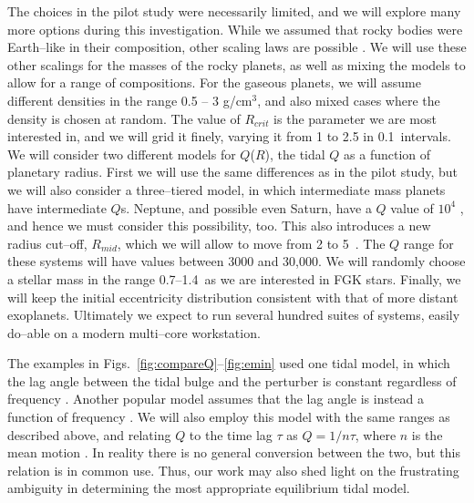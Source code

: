 The choices in the pilot study were necessarily limited, and we will
explore many more options during this investigation.  While we assumed that
rocky bodies were Earth--like in their composition, other scaling laws
are possible \citep[e.g.][]{Seager07,Fortney07,Lissauer11}.  We will
use these other scalings for the masses of the rocky planets, as well
as mixing the models to allow for a range of compositions.  For the
gaseous planets, we will assume different densities in the range 0.5
-- 3 g/cm$^3$, and also mixed cases where the density is chosen at
random.  The value of $R_{crit}$ is the parameter we are most
interested in, and we will grid it finely, varying it from 1 to 2.5
\rearth in 0.1~\rearth intervals.  We will consider two different
models for $Q$($R$), the tidal $Q$ as a function of planetary radius.
First we will use the same differences as in the pilot study, but we
will also consider a three--tiered model, in which intermediate mass
planets have intermediate $Q$s.  Neptune, and possible even Saturn,
have a $Q$ value of $10^4$ \citep{ZhangHamilton08,Lainey12}, and hence
we must consider this possibility, too.  This also introduces a new
radius cut--off, $R_{mid}$, which we will allow to move from 2 to
5~\rearth.  The $Q$ range for these systems will have values between
3000 and 30,000.  We will randomly choose a stellar mass in the range
0.7--1.4~\msun as we are interested in FGK stars.  Finally, we will
keep the initial eccentricity distribution consistent with that of
more distant exoplanets.  Ultimately we expect to run several hundred
suites of systems, easily do--able on a modern multi--core
workstation.

The examples in Figs.~\ref{fig:compareQ}--\ref{fig:emin} used one
tidal model, in which the lag angle between the tidal bulge and the
perturber is constant regardless of frequency
\citep[e.g.][]{GoldreichSoter66,Jackson08}.  Another popular model
assumes that the lag angle is instead a function of frequency
\citep[e.g.][]{Hut81,Matsumura10}.  We will also employ this model
with the same ranges as described above, and relating $Q$ to the time
lag $\tau$ as $Q = 1/n\tau$, where $n$ is the mean motion
\citep[e.g.][]{Correia12}.  In reality there is no general conversion between
the two, but this relation is in common use.  Thus, our work may also
shed light on the frustrating ambiguity in determining the most
appropriate equilibrium tidal model.

\medskip
{\centerline{}}
\smallskip

